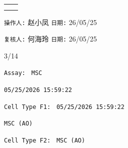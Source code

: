 \documentclass[UTF8,10pt,a4paper,fontset=fandol]{ctexart}
\newcommand{\fieldvalue}[1]{#1}
\newcommand{\handwritten}[1]{#1}
\begin{document}
\medskip

\begin{center}
\begin{tabular}{cc}
\fbox{\rule{0pt}{1.25in}\rule{0.37\linewidth}{0pt}}
&
\fbox{\rule{0pt}{1.25in}\rule{0.37\linewidth}{0pt}}
\\[1.5em]
\fbox{\rule{0pt}{1.25in}\rule{0.37\linewidth}{0pt}}
&
\fbox{\rule{0pt}{1.25in}\rule{0.37\linewidth}{0pt}}
\end{tabular}
\end{center}

\vfill

\noindent\texttt{操作人:}
\fieldvalue{\handwritten{赵小凤}}
\hfill
\texttt{日期:}
\fieldvalue{\handwritten{26/05/25}}

\medskip

\noindent\texttt{复核人:}
\fieldvalue{\handwritten{何海玲}}
\hfill
\texttt{日期:}
\fieldvalue{\handwritten{26/05/25}}

\begin{flushright}
\handwritten{3/14}
\end{flushright}

\newpage

\noindent\texttt{Assay: }
\fieldvalue{\texttt{MSC}}

\noindent\texttt{05/25/2026 15:59:22}

\noindent\texttt{Cell Type F1: }
\fieldvalue{\texttt{05/25/2026 15:59:22}}

\noindent\texttt{MSC (AO)}

\noindent\texttt{Cell Type F2: }
\fieldvalue{\texttt{MSC (AO)}}
\end{document}
